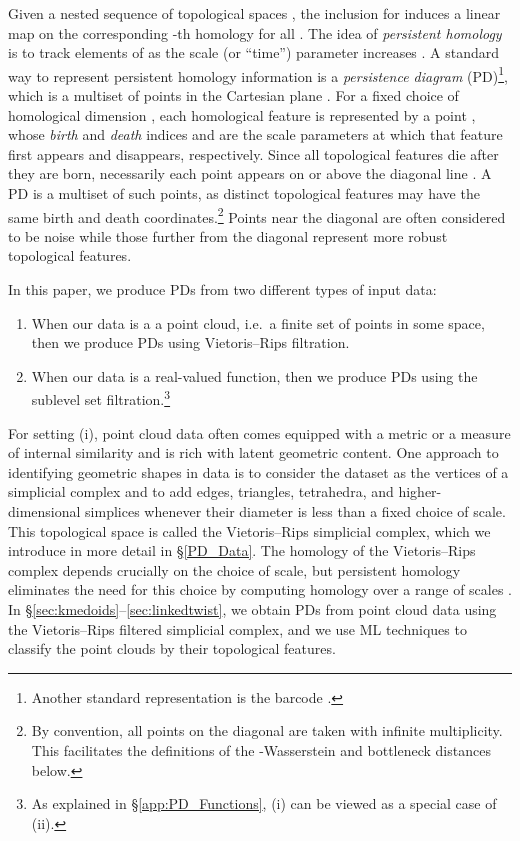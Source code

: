 \documentclass[11pt]{article}
\begin{document}
Given a nested sequence of topological spaces , the inclusion  for  induces a linear map  on the corresponding -th homology for all . The idea of \emph{persistent homology} is to track elements of  as the scale (or ``time'') parameter  increases \citep{edelsbrunner2008persistent,computingPH,Edelsbrunner10}. A standard way to represent persistent homology information is a \emph{persistence diagram} (PD)\footnote{Another standard representation is the barcode \citep{barcodes}.}, which is a multiset of points in the Cartesian plane . For a fixed choice of homological dimension , each homological feature is represented by a point , whose \emph{birth} and \emph{death} indices  and  are the scale parameters at which that feature first appears and disappears, respectively. Since all topological features die after they are born, necessarily each point appears on or above the diagonal line . A PD is a multiset of such points, as distinct topological features may have the same birth and death coordinates.\footnote{By convention, all points on the diagonal are taken with infinite multiplicity. This facilitates the definitions of the -Wasserstein and bottleneck distances below.} Points near the diagonal are often considered to be noise while those further from the diagonal represent more robust topological features. 

In this paper, we produce PDs from two different types of input data:
\begin{enumerate}[label=(\roman*)]
\item When our data is a a point cloud, i.e.\ a finite set of points in some space, then we produce PDs using Vietoris--Rips filtration.
\item When our data is a real-valued function, then we produce PDs using the sublevel set filtration.\footnote{As explained in \S\ref{app:PD_Functions}, (i) can be viewed as a special case of (ii).}
\end{enumerate}
For setting (i), point cloud data often comes equipped with a metric or a measure of internal similarity and is rich with latent geometric content. One approach to identifying geometric shapes in data is to consider the dataset as the vertices of a simplicial complex and to add edges, triangles, tetrahedra, and higher-dimensional simplices whenever their diameter is less than a fixed choice of scale. This topological space is called the Vietoris--Rips simplicial complex, which we introduce in more detail in \S\ref{PD_Data}. The homology of the Vietoris--Rips complex depends crucially on the choice of scale, but persistent homology eliminates the need for this choice by computing homology over a range of scales \citep{carlsson2009topology,barcodes}. In \S\ref{sec:kmedoids}--\ref{sec:linkedtwist}, we obtain PDs from point cloud data using the Vietoris--Rips filtered simplicial complex, and we use ML techniques to classify the point clouds by their topological features.
\end{document}
